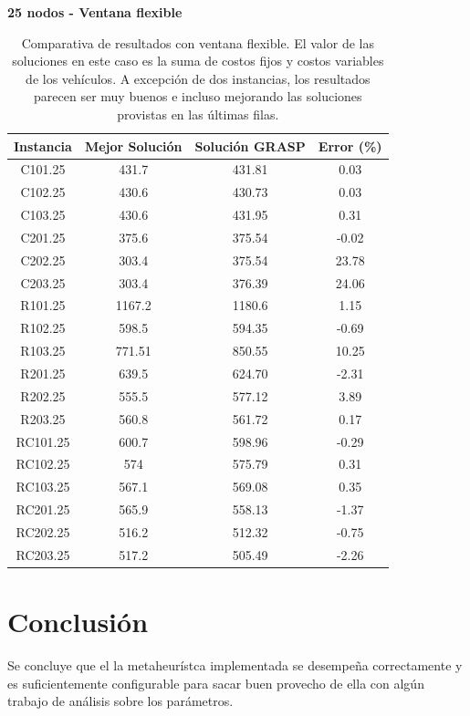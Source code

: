 \documentclass{article}
\begin{document}
  \begin{table}
    \centering
    \caption*{{\bf 25 nodos - Ventana flexible}}
    \begin{tabular}{cccc}
      \toprule
      Instancia & Mejor Solución & Solución GRASP & Error (\%) \\
      \midrule
      C101.25  &  431.7	 & 431.81 &	0.03  \\
      C102.25  &  430.6	 & 430.73 &	0.03 \\
      C103.25  &  430.6	 & 431.95 &	0.31 \\
      C201.25  &  375.6	 & 375.54 &	-0.02 \\
      C202.25  &  303.4	 & 375.54 &	23.78 \\
      C203.25  &  303.4	 & 376.39 &	24.06 \\
      R101.25  &  1167.2 & 1180.6 &  1.15 \\
      R102.25  &  598.5	 & 594.35 &	-0.69 \\
      R103.25  &  771.51 & 850.55 &	10.25 \\
      R201.25  &  639.5	 & 624.70 &	-2.31 \\
      R202.25  &  555.5	 & 577.12 &	3.89 \\
      R203.25  &  560.8	 & 561.72 &	0.17 \\
      RC101.25 &  600.7	 & 598.96 &	-0.29 \\
      RC102.25 &  574	   & 575.79 &	0.31 \\
      RC103.25 &  567.1	 & 569.08 &	0.35 \\
      RC201.25 &  565.9	 & 558.13 &	-1.37 \\
      RC202.25 &  516.2	 & 512.32 &	-0.75 \\
      RC203.25 &  517.2	 & 505.49 &	-2.26 \\
      \bottomrule
    \end{tabular}
    \caption{Comparativa de resultados con ventana flexible. El valor de las soluciones en este caso es la suma de costos fijos y costos variables de los vehículos. A excepción de dos instancias, los resultados parecen ser muy buenos e incluso mejorando las soluciones provistas en las últimas filas.}\label{table:res25nodesflexible}
  \end{table}

  \section*{Conclusión}

  Se concluye que el la metaheurístca implementada se desempeña correctamente y es suficientemente configurable para sacar buen provecho de ella con algún trabajo de análisis sobre los parámetros.
\end{document}
